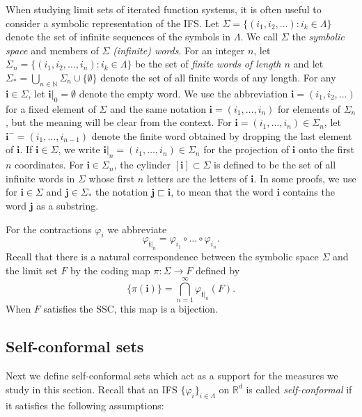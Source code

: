 \documentclass{PRM}
\newcommand{\field}[1]{\mathbb{#1}}
\newcommand{\N}{\field{N}}
\newcommand{\R}{\field{R}}
\theoremstyle{plain}
\theoremstyle{definition}
\theoremstyle{remark}
\begin{document}
When studying limit sets of iterated function systems, it is often useful to consider a symbolic representation of the IFS. Let $\Sigma=\{(i_1,i_2,\ldots)\colon i_k\in\Lambda\}$ denote the set of infinite sequences of the symbols in $\Lambda$. We call $\Sigma$ the \emph{symbolic space} and members of $\Sigma$ \emph{(infinite) words}. For an integer $n$, let $\Sigma_n=\{(i_1,i_2,\ldots,i_n)\colon i_k\in\Lambda\}$ be the set of \emph{finite words of length $n$} and let $\Sigma_*=\bigcup_{n\in\N}\Sigma_n\cup\{\emptyset\}$ denote the set of all finite words of any length. For any $\mathbf{i}\in\Sigma$, let $\mathbf{i}|_0=\emptyset$ denote the empty word. We use the abbreviation $\mathbf{i}=(i_1,i_2,\ldots)$ for a fixed element of $\Sigma$ and the same notation $\mathbf{i}=(i_1,\ldots,i_n)$ for elements of $\Sigma_n$, but the meaning will be clear from the context. For $\mathbf{i}=(i_1,\ldots,i_n)\in\Sigma_n$, let $\mathbf{i}^-=(i_1,\ldots,i_{n-1})$ denote the finite word obtained by dropping the last element of $\mathbf{i}$. If $\mathbf{i}\in\Sigma$, we write $\mathbf{i}|_n=(i_1,\ldots,i_n)\in\Sigma_n$ for the projection of $\mathbf{i}$ onto the first $n$ coordinates. For $\mathbf{i}\in\Sigma_n$, the cylinder $[\mathbf{i}]\subset \Sigma$ is defined to be the set of all infinite words in $\Sigma$ whose first $n$ letters are the letters of $\mathbf{i}$. In some proofs, we use for $\mathbf{i}\in\Sigma$ and $\mathbf{j}\in\Sigma_*$ the notation $\mathbf{j}\sqsubset\mathbf{i} $, to mean that the word $\mathbf{i}$ contains the word $\mathbf{j}$ as a substring.

For the contractions $\varphi_i$ we abbreviate
\begin{equation*}
    \varphi_{\mathbf{i}|_n}=\varphi_{i_1}\circ\ldots\circ \varphi_{i_n}.
\end{equation*}
Recall that there is a natural correspondence between the symbolic space $\Sigma$ and the limit set $F$ by the coding map $\pi:\Sigma\to F$ defined by
\begin{equation}\label{eq:code_map}
    \{\pi(\mathbf{i})\}=\bigcap_{n=1}^{\infty}\varphi_{\mathbf{i}|_n}(F).
\end{equation}
When $F$ satisfies the SSC, this map is a bijection.

\subsection{Self-conformal sets}\label{subsec:self-conformal}

Next we define self-conformal sets which act as a support for the measures we study in this section. Recall that an IFS $\{\varphi_i\}_{i\in\Lambda}$ on $\R^d$ is called \emph{self-conformal} if it satisfies the following assumptions:
\end{document}
